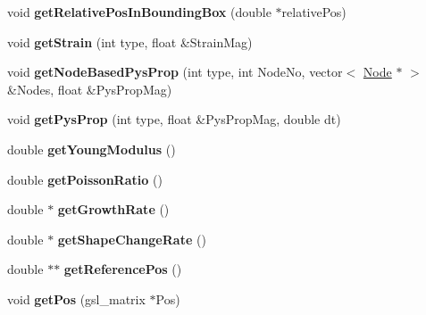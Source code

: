 \begin{DoxyCompactItemize}
\item 
\hypertarget{classShapeBase_a0d33afa938cd84b1376806a06769f6b9}{}void {\bfseries get\+Relative\+Pos\+In\+Bounding\+Box} (double $\ast$relative\+Pos)\label{classShapeBase_a0d33afa938cd84b1376806a06769f6b9}

\item 
\hypertarget{classShapeBase_aecf99016ea7c36e0bff43a40e6a89df3}{}void {\bfseries get\+Strain} (int type, float \&Strain\+Mag)\label{classShapeBase_aecf99016ea7c36e0bff43a40e6a89df3}

\item 
\hypertarget{classShapeBase_ac1368b84a5ed722fa7b9f82656b49969}{}void {\bfseries get\+Node\+Based\+Pys\+Prop} (int type, int Node\+No, vector$<$ \hyperlink{classNode}{Node} $\ast$ $>$ \&Nodes, float \&Pys\+Prop\+Mag)\label{classShapeBase_ac1368b84a5ed722fa7b9f82656b49969}

\item 
\hypertarget{classShapeBase_abff91451c3465778ed89624d6196f7f6}{}void {\bfseries get\+Pys\+Prop} (int type, float \&Pys\+Prop\+Mag, double dt)\label{classShapeBase_abff91451c3465778ed89624d6196f7f6}

\item 
\hypertarget{classShapeBase_ade96ff86461eaabce716e83fa68bfa19}{}double {\bfseries get\+Young\+Modulus} ()\label{classShapeBase_ade96ff86461eaabce716e83fa68bfa19}

\item 
\hypertarget{classShapeBase_a01140f17779cd2e990c9f28e3c86b77e}{}double {\bfseries get\+Poisson\+Ratio} ()\label{classShapeBase_a01140f17779cd2e990c9f28e3c86b77e}

\item 
\hypertarget{classShapeBase_a94b472ab0c5242226313cd096e17a3fe}{}double $\ast$ {\bfseries get\+Growth\+Rate} ()\label{classShapeBase_a94b472ab0c5242226313cd096e17a3fe}

\item 
\hypertarget{classShapeBase_a6f4d5556ac05b897919f49dacd0f8101}{}double $\ast$ {\bfseries get\+Shape\+Change\+Rate} ()\label{classShapeBase_a6f4d5556ac05b897919f49dacd0f8101}

\item 
\hypertarget{classShapeBase_a91ba74cc41917dbe821159023f1bf1ec}{}double $\ast$$\ast$ {\bfseries get\+Reference\+Pos} ()\label{classShapeBase_a91ba74cc41917dbe821159023f1bf1ec}

\item 
\hypertarget{classShapeBase_ab1906a5afda8fcbeef23010759f2538c}{}void {\bfseries get\+Pos} (gsl\+\_\+matrix $\ast$Pos)\label{classShapeBase_ab1906a5afda8fcbeef23010759f2538c}


\end{DoxyCompactItemize}
